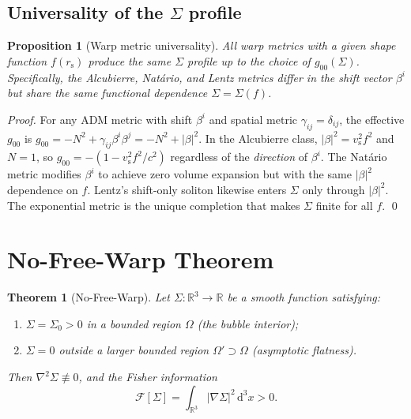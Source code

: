\documentclass[prd,twocolumn,superscriptaddress,longbibliography]{revtex4-2}
\newcommand{\vs}{v_{\mathrm{s}}}
\newcommand{\rs}{r_{\mathrm{s}}}
\newcommand{\Fisher}{\mathcal{F}}
\newcommand{\dd}{\mathrm{d}}
\newtheorem{theorem}{Theorem}
\newtheorem{proposition}{Proposition}
\begin{document}
\subsection{Universality of the $\Sigma$ profile}

\begin{proposition}[Warp metric universality]
\label{prop:universality}
All warp metrics with a given shape function $f(\rs)$ produce the
same $\Sigma$ profile up to the choice of $g_{00}(\Sigma)$.
Specifically, the Alcubierre, Nat\'{a}rio, and Lentz metrics
differ in the shift vector $\beta^i$ but share the same
functional dependence $\Sigma = \Sigma(f)$.
\end{proposition}

\noindent\emph{Proof.}\;
For any ADM metric with shift $\beta^i$ and spatial metric
$\gamma_{ij} = \delta_{ij}$, the effective $g_{00}$ is
$g_{00} = -N^2 + \gamma_{ij}\beta^i\beta^j = -N^2 + |\beta|^2$.
In the Alcubierre class, $|\beta|^2 = \vs^2 f^2$ and $N = 1$,
so $g_{00} = -(1 - \vs^2 f^2/c^2)$ regardless of the
\emph{direction} of $\beta^i$.  The Nat\'{a}rio metric modifies
$\beta^i$ to achieve zero volume expansion but with the same
$|\beta|^2$ dependence on $f$.  Lentz's shift-only soliton
likewise enters $\Sigma$ only through $|\beta|^2$.  The
exponential metric is the unique completion that makes $\Sigma$
finite for all $f$.  \qed

\section{No-Free-Warp Theorem}
\label{sec:nofree}

\begin{theorem}[No-Free-Warp]
\label{thm:nofree}
Let $\Sigma : \mathbb{R}^3 \to \mathbb{R}$ be a smooth function
satisfying:
\begin{enumerate}
\item[(i)] $\Sigma = \Sigma_0 > 0$ in a bounded region
$\Omega$ (the bubble interior);
\item[(ii)] $\Sigma = 0$ outside a larger bounded region
$\Omega' \supset \Omega$ (asymptotic flatness).
\end{enumerate}
Then $\nabla^2\Sigma \not\equiv 0$, and the Fisher information
\begin{equation}
\Fisher[\Sigma] = \int_{\mathbb{R}^3} |\nabla\Sigma|^2\,\dd^3x > 0.
\end{equation}
\end{theorem}
\end{document}
